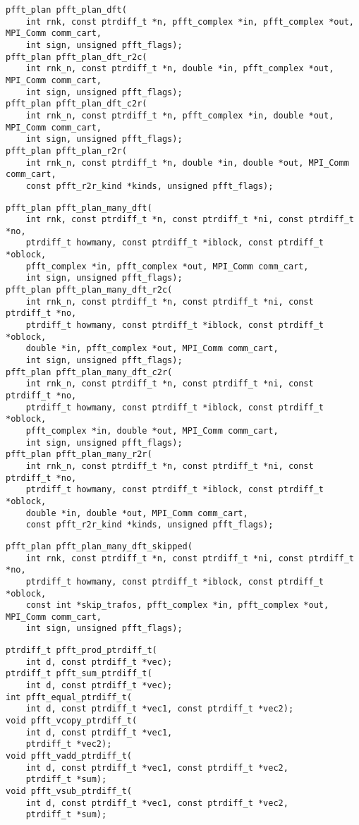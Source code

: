 \begin{lstlisting}
pfft_plan pfft_plan_dft(
    int rnk, const ptrdiff_t *n, pfft_complex *in, pfft_complex *out, MPI_Comm comm_cart,
    int sign, unsigned pfft_flags);
pfft_plan pfft_plan_dft_r2c(
    int rnk_n, const ptrdiff_t *n, double *in, pfft_complex *out, MPI_Comm comm_cart,
    int sign, unsigned pfft_flags);
pfft_plan pfft_plan_dft_c2r(
    int rnk_n, const ptrdiff_t *n, pfft_complex *in, double *out, MPI_Comm comm_cart,
    int sign, unsigned pfft_flags);
pfft_plan pfft_plan_r2r(
    int rnk_n, const ptrdiff_t *n, double *in, double *out, MPI_Comm comm_cart,
    const pfft_r2r_kind *kinds, unsigned pfft_flags);
\end{lstlisting}

\begin{lstlisting}
pfft_plan pfft_plan_many_dft(
    int rnk, const ptrdiff_t *n, const ptrdiff_t *ni, const ptrdiff_t *no,
    ptrdiff_t howmany, const ptrdiff_t *iblock, const ptrdiff_t *oblock,
    pfft_complex *in, pfft_complex *out, MPI_Comm comm_cart,
    int sign, unsigned pfft_flags);
pfft_plan pfft_plan_many_dft_r2c(
    int rnk_n, const ptrdiff_t *n, const ptrdiff_t *ni, const ptrdiff_t *no,
    ptrdiff_t howmany, const ptrdiff_t *iblock, const ptrdiff_t *oblock,
    double *in, pfft_complex *out, MPI_Comm comm_cart,
    int sign, unsigned pfft_flags);
pfft_plan pfft_plan_many_dft_c2r(
    int rnk_n, const ptrdiff_t *n, const ptrdiff_t *ni, const ptrdiff_t *no,
    ptrdiff_t howmany, const ptrdiff_t *iblock, const ptrdiff_t *oblock,
    pfft_complex *in, double *out, MPI_Comm comm_cart,
    int sign, unsigned pfft_flags);
pfft_plan pfft_plan_many_r2r(
    int rnk_n, const ptrdiff_t *n, const ptrdiff_t *ni, const ptrdiff_t *no,
    ptrdiff_t howmany, const ptrdiff_t *iblock, const ptrdiff_t *oblock,
    double *in, double *out, MPI_Comm comm_cart,
    const pfft_r2r_kind *kinds, unsigned pfft_flags);
\end{lstlisting}

\begin{lstlisting}
pfft_plan pfft_plan_many_dft_skipped(
    int rnk, const ptrdiff_t *n, const ptrdiff_t *ni, const ptrdiff_t *no,
    ptrdiff_t howmany, const ptrdiff_t *iblock, const ptrdiff_t *oblock,
    const int *skip_trafos, pfft_complex *in, pfft_complex *out, MPI_Comm comm_cart,
    int sign, unsigned pfft_flags);
\end{lstlisting}

\begin{lstlisting}
ptrdiff_t pfft_prod_ptrdiff_t(
    int d, const ptrdiff_t *vec);
ptrdiff_t pfft_sum_ptrdiff_t(
    int d, const ptrdiff_t *vec);
int pfft_equal_ptrdiff_t(
    int d, const ptrdiff_t *vec1, const ptrdiff_t *vec2);
void pfft_vcopy_ptrdiff_t(
    int d, const ptrdiff_t *vec1,
    ptrdiff_t *vec2);
void pfft_vadd_ptrdiff_t(
    int d, const ptrdiff_t *vec1, const ptrdiff_t *vec2,
    ptrdiff_t *sum);
void pfft_vsub_ptrdiff_t(
    int d, const ptrdiff_t *vec1, const ptrdiff_t *vec2,
    ptrdiff_t *sum);
\end{lstlisting}

